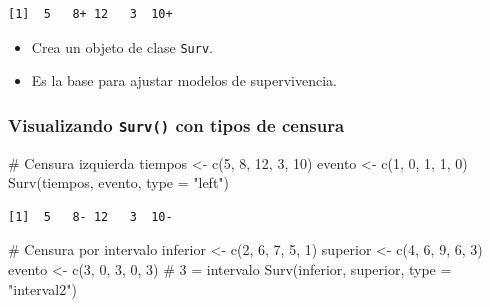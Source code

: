 \documentclass[
]{article}
\newenvironment{Shaded}{\begin{snugshade}}{\end{snugshade}}
\newcommand{\AttributeTok}[1]{\textcolor[rgb]{0.40,0.45,0.13}{#1}}
\newcommand{\CommentTok}[1]{\textcolor[rgb]{0.37,0.37,0.37}{#1}}
\newcommand{\DecValTok}[1]{\textcolor[rgb]{0.68,0.00,0.00}{#1}}
\newcommand{\FunctionTok}[1]{\textcolor[rgb]{0.28,0.35,0.67}{#1}}
\newcommand{\NormalTok}[1]{\textcolor[rgb]{0.00,0.23,0.31}{#1}}
\newcommand{\OtherTok}[1]{\textcolor[rgb]{0.00,0.23,0.31}{#1}}
\newcommand{\StringTok}[1]{\textcolor[rgb]{0.13,0.47,0.30}{#1}}
\providecommand{\tightlist}{%
  \setlength{\itemsep}{0pt}\setlength{\parskip}{0pt}}
\begin{document}
\begin{verbatim}
[1]  5   8+ 12   3  10+
\end{verbatim}

\begin{itemize}
\tightlist
\item
  Crea un objeto de clase \texttt{Surv}.
\item
  Es la base para ajustar modelos de supervivencia.
\end{itemize}

\subsubsection{\texorpdfstring{Visualizando \texttt{Surv()} con tipos de
censura}{Visualizando Surv() con tipos de censura}}\label{visualizando-surv-con-tipos-de-censura}

\begin{Shaded}
\begin{Highlighting}[]
\CommentTok{\# Censura izquierda}
\NormalTok{tiempos }\OtherTok{\textless{}{-}} \FunctionTok{c}\NormalTok{(}\DecValTok{5}\NormalTok{, }\DecValTok{8}\NormalTok{, }\DecValTok{12}\NormalTok{, }\DecValTok{3}\NormalTok{, }\DecValTok{10}\NormalTok{)}
\NormalTok{evento }\OtherTok{\textless{}{-}} \FunctionTok{c}\NormalTok{(}\DecValTok{1}\NormalTok{, }\DecValTok{0}\NormalTok{, }\DecValTok{1}\NormalTok{, }\DecValTok{1}\NormalTok{, }\DecValTok{0}\NormalTok{)}
\FunctionTok{Surv}\NormalTok{(tiempos, evento, }\AttributeTok{type =} \StringTok{"left"}\NormalTok{)}
\end{Highlighting}
\end{Shaded}

\begin{verbatim}
[1]  5   8- 12   3  10-
\end{verbatim}

\begin{Shaded}
\begin{Highlighting}[]
\CommentTok{\# Censura por intervalo}
\NormalTok{inferior }\OtherTok{\textless{}{-}} \FunctionTok{c}\NormalTok{(}\DecValTok{2}\NormalTok{, }\DecValTok{6}\NormalTok{, }\DecValTok{7}\NormalTok{, }\DecValTok{5}\NormalTok{, }\DecValTok{1}\NormalTok{)}
\NormalTok{superior }\OtherTok{\textless{}{-}} \FunctionTok{c}\NormalTok{(}\DecValTok{4}\NormalTok{, }\DecValTok{6}\NormalTok{, }\DecValTok{9}\NormalTok{, }\DecValTok{6}\NormalTok{, }\DecValTok{3}\NormalTok{)}
\NormalTok{evento }\OtherTok{\textless{}{-}} \FunctionTok{c}\NormalTok{(}\DecValTok{3}\NormalTok{, }\DecValTok{0}\NormalTok{, }\DecValTok{3}\NormalTok{, }\DecValTok{0}\NormalTok{, }\DecValTok{3}\NormalTok{)  }\CommentTok{\# 3 = intervalo}
\FunctionTok{Surv}\NormalTok{(inferior, superior, }\AttributeTok{type =} \StringTok{"interval2"}\NormalTok{)}
\end{Highlighting}
\end{Shaded}
\end{document}
